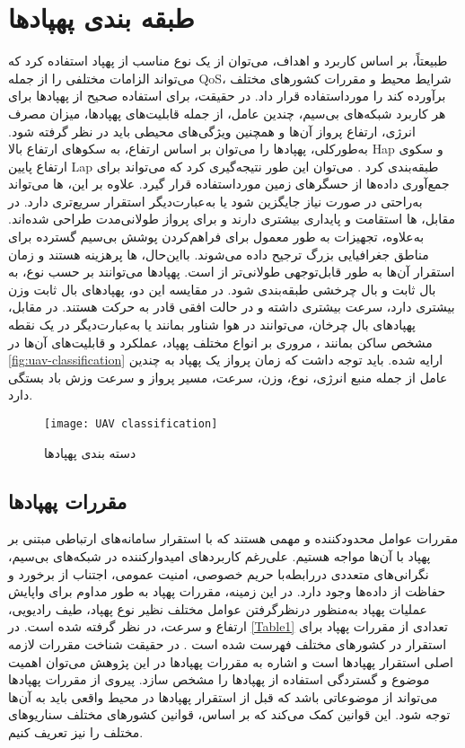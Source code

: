 \section{طبقه بندی پهپادها}
طبیعتاً، بر اساس کاربرد و اهداف، می‌توان از یک نوع مناسب از پهپاد استفاده کرد که می‌تواند الزامات مختلفی را از جمله \gls{QoS}، شرایط محیط و مقررات کشورهای مختلف برآورده کند را مورداستفاده قرار داد. در حقیقت، برای استفاده صحیح از پهپادها برای هر کاربرد شبکه‌های بی‌سیم، چندین عامل، از جمله قابلیت‌های پهپادها، میزان مصرف انرژی، ارتفاع پرواز آن‌ها و همچنین ویژگی‌های محیطی باید در نظر گرفته شود. به‌طورکلی، پهپادها را می‌توان بر اساس ارتفاع، به سکوهای ارتفاع بالا \gls{Hap} و سکوی ارتفاع پایین \gls{Lap} طبقه‌بندی کرد \cite{al2014modeling}.
می‌توان این طور نتیجه‌گیری کرد که  می‌تواند برای جمع‌آوری داده‌ها از حسگرهای زمین مورداستفاده قرار گیرد. علاوه بر این، ها می‌تواند به‌راحتی در صورت نیاز جایگزین شود یا به‌عبارت‌دیگر استقرار سریع‌تری دارد. در مقابل، ها استقامت و پایداری بیشتری دارند و برای پرواز طولانی‌مدت طراحی شده‌اند. به‌علاوه، تجهیزات  به طور معمول برای فراهم‌کردن پوشش بی‌سیم گسترده برای مناطق جغرافیایی بزرگ ترجیح داده می‌شوند. بااین‌حال، ها پرهزینه هستند و زمان استقرار آن‌ها به طور قابل‌توجهی طولانی‌تر از  است.
پهپادها می‌توانند بر حسب نوع، به بال ثابت و بال چرخشی طبقه‌بندی شود. در مقایسه این دو، پهپادهای بال ثابت وزن بیشتری دارد، سرعت بیشتری داشته و در حالت افقی قادر به حرکت هستند. در مقابل، پهپادهای بال چرخان، می‌توانند در هوا شناور بمانند یا به‌عبارت‌دیگر در یک نقطه مشخص ساکن بمانند \cite{zeng2016wireless}، مروری بر انواع مختلف پهپاد، عملکرد و قابلیت‌های آن‌ها در \autoref{fig:uav-classification} ارایه شده. باید توجه داشت که زمان پرواز یک پهپاد به چندین عامل از جمله منبع انرژی، نوع، وزن، سرعت، مسیر پرواز و سرعت وزش باد بستگی دارد.
\begin{figure}
\texttt{[image: UAV classification]}
\caption[%
دسته بندی پهپاد‌ها]{دسته بندی پهپاد‌ها}
\label{fig:uav-classification}
\end{figure}
\subsection{مقررات پهپادها}
مقررات عوامل محدودکننده و مهمی هستند که با استقرار سامانه‌های ارتباطی مبتنی بر پهپاد با آن‌ها مواجه هستیم. علی‌رغم کاربردهای امیدوارکننده در شبکه‌های بی‌سیم، نگرانی‌های متعددی دررابطه‌با حریم خصوصی، امنیت عمومی، اجتناب از برخورد و حفاظت از داده‌ها وجود دارد. در این زمینه، مقررات پهپاد به طور مداوم برای واپایش عملیات پهپاد به‌منظور درنظرگرفتن عوامل مختلف نظیر نوع پهپاد، طیف رادیویی، ارتفاع و سرعت، در نظر گرفته شده است. در \autoref{Table1} تعدادی از مقررات پهپاد برای استقرار در کشورهای مختلف فهرست شده است \cite{8675384}.
در حقیقت شناخت مقررات لازمه اصلی استقرار پهپادها است و اشاره به مقررات پهپادها در این پژوهش می‌توان اهمیت موضوع و گستردگی استفاده از پهپادها را مشخص سازد. پیروی از مقررات پهپادها می‌تواند از موضوعاتی باشد که قبل از استقرار پهپادها در محیط واقعی باید به آن‌ها توجه شود. این قوانین کمک می‌کند که بر اساس، قوانین کشورهای مختلف سناریوهای مختلف را نیز تعریف کنیم.

